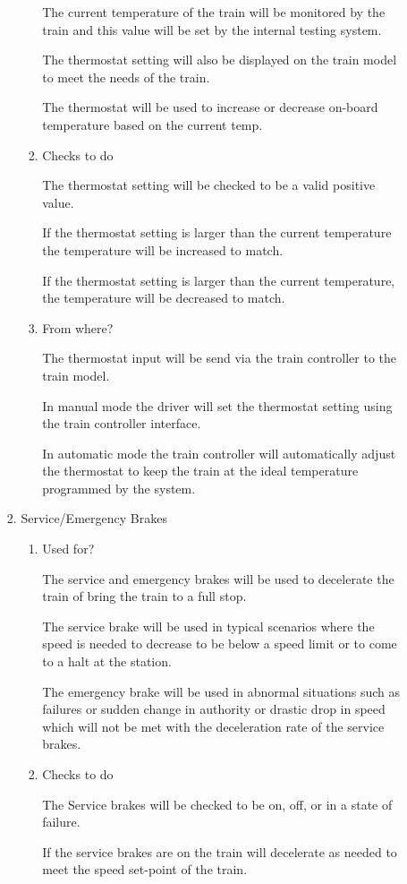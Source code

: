 \documentclass[11pt]{article}
\begin{document}
\begin{enumerate}
\begin{enumerate}
\begin{enumerate}
\begin{enumerate}
The current temperature of the train will be monitored by the train and this value will be set by the internal testing system.

The thermostat setting will also be displayed on the train model to meet the needs of the train. 

The thermostat will be used to increase or decrease on-board temperature based on the current temp.
\item Checks to do
\label{sec-3-1-4-2-1-5-2}

The thermostat setting will be checked to be a valid positive value.

If the thermostat setting is larger than the current temperature the temperature will be increased to match.

If the thermostat setting is larger than the current temperature, the temperature will be decreased to match.
\item From where?
\label{sec-3-1-4-2-1-5-3}

The thermostat input will be send via the train controller to the train model.

In manual mode the driver will  set the thermostat setting using the train controller interface.

In automatic mode the train controller will automatically adjust the thermostat to keep the train at the ideal temperature programmed by the system.
\end{enumerate}
\item Service/Emergency Brakes
\label{sec-3-1-4-2-1-6}
\begin{enumerate}
\item Used for?
\label{sec-3-1-4-2-1-6-1}

The service and emergency brakes will be used to decelerate the train of bring the train to a full stop.

The service brake will be used in typical scenarios where the speed is needed to decrease to be below a speed limit or to come to a halt at the station.

The emergency brake will be used in abnormal situations such as failures or sudden change in authority or drastic drop in speed which will not be met with the deceleration rate of the service brakes.
\item Checks to do
\label{sec-3-1-4-2-1-6-2}

The Service brakes will be checked to be on, off, or in a state of failure. 

If the service brakes are on the train will decelerate as needed to meet the speed set-point of the train.


\end{enumerate}
\end{enumerate}
\end{enumerate}
\end{enumerate}
\end{document}
